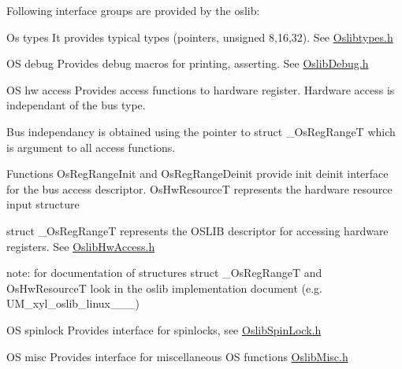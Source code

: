 \-Following interface groups are provided by the oslib\-: \begin{DoxyParagraph}{\-Os types}
\-It provides typical types (pointers, unsigned 8,16,32). \-See \hyperlink{_oslib_types_8h}{\-Oslibtypes.\-h} 
\end{DoxyParagraph}
\begin{DoxyParagraph}{\-O\-S debug }
\-Provides debug macros for printing, asserting. \-See \hyperlink{_oslib_debug_8h}{\-Oslib\-Debug.\-h} 
\end{DoxyParagraph}
\begin{DoxyParagraph}{\-O\-S hw access }
\-Provides access functions to hardware register. \-Hardware access is independant of the bus type. \par
 \-Bus independancy is obtained using the pointer to struct \-\_\-\-Os\-Reg\-Range\-T which is argument to all access functions. \par
 \-Functions \-Os\-Reg\-Range\-Init and \-Os\-Reg\-Range\-Deinit provide init deinit interface for the bus access descriptor. \-Os\-Hw\-Resource\-T represents the hardware resource input structure\par
 struct \-\_\-\-Os\-Reg\-Range\-T represents the \-O\-S\-L\-I\-B descriptor for accessing hardware registers. \-See \hyperlink{_oslib_hw_access_8h}{\-Oslib\-Hw\-Access.\-h} \par

\begin{DoxyItemize}
\item note\-: for documentation of structures struct \-\_\-\-Os\-Reg\-Range\-T and \-Os\-Hw\-Resource\-T look in the oslib implementation document (e.\-g. \-U\-M\-\_\-xyl\-\_\-oslib\-\_\-linux\-\_\-\_\-\_) 
\end{DoxyItemize}
\end{DoxyParagraph}
\begin{DoxyParagraph}{\-O\-S spinlock }
\-Provides interface for spinlocks, see \hyperlink{_oslib_spin_lock_8h}{\-Oslib\-Spin\-Lock.\-h} 
\end{DoxyParagraph}
\begin{DoxyParagraph}{\-O\-S misc }
\-Provides interface for miscellaneous \-O\-S functions \hyperlink{_oslib_misc_8h}{\-Oslib\-Misc.\-h} 
\end{DoxyParagraph}
